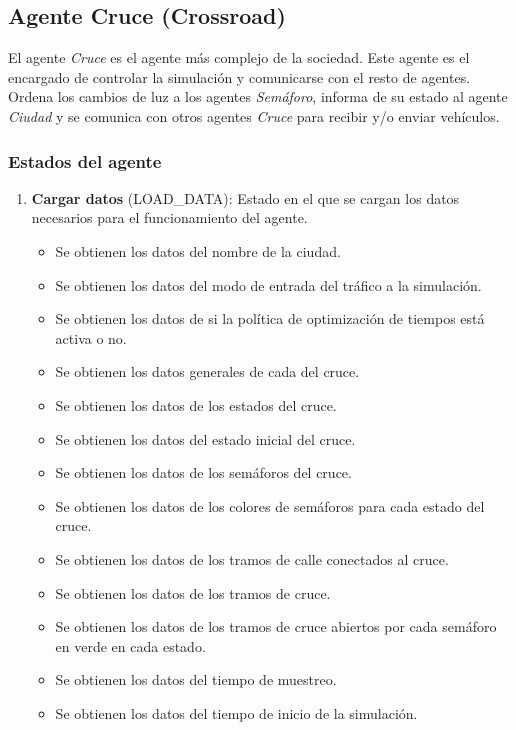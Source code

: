 \newpage
\subsection{Agente Cruce (Crossroad)}
El agente \textit{Cruce} es el agente más complejo de la sociedad. Este agente es el encargado de controlar la simulación y comunicarse con el resto de agentes. Ordena los cambios de luz a los agentes \textit{Semáforo}, informa de su estado al agente \textit{Ciudad} y se comunica con otros agentes \textit{Cruce} para recibir y/o enviar vehículos.

\subsubsection{Estados del agente}
\begin{enumerate}
    \item \textbf{Cargar datos} \footnotesize(LOAD\_DATA)\normalsize: Estado en el que se cargan los datos necesarios para el funcionamiento del agente.
    \begin{itemize}
        \item Se obtienen los datos del nombre de la ciudad.
        \item Se obtienen los datos del modo de entrada del tráfico a la simulación.
        \item Se obtienen los datos de si la política de optimización de tiempos está activa o no.
        \item Se obtienen los datos generales de cada del cruce.
        \item Se obtienen los datos de los estados del cruce.
        \item Se obtienen los datos del estado inicial del cruce.
        \item Se obtienen los datos de los semáforos del cruce.
        \item Se obtienen los datos de los colores de semáforos para cada estado del cruce.
        \item Se obtienen los datos de los tramos de calle conectados al cruce.
        \item Se obtienen los datos de los tramos de cruce.
        \item Se obtienen los datos de los tramos de cruce abiertos por cada semáforo en verde en cada estado.
        \item Se obtienen los datos del tiempo de muestreo.
        \item Se obtienen los datos del tiempo de inicio de la simulación.

\end{itemize}
\end{enumerate}
